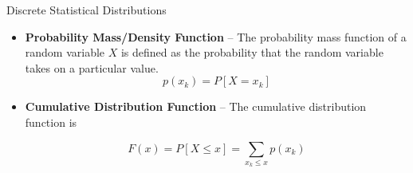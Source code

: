 \documentclass[10pt,ignorenonframetext,aspectratio=169]{beamer}
\begin{document}
\begin{frame}{Discrete Statistical Distributions}

\begin{itemize}
    \item \textbf{Probability Mass/Density Function} -- The probability mass function of a random variable $X$ is defined as the probability that the random variable takes on a particular value.
        \begin{equation}
            p \left( x _ { k } \right) = P \left[ X = x _ { k } \right]
        \end{equation}
    \item \textbf{Cumulative Distribution Function} -- The cumulative distribution function is
    
    \begin{equation}
        F ( x ) = P [ X \leq x ] = \sum _ { x _ { k } \leq x } p \left( x _ { k } \right)
    \end{equation}
\end{itemize}    
\end{frame}
\end{document}
